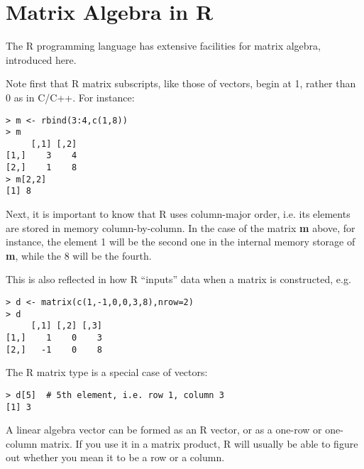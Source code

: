 \section{Matrix Algebra in R}

The R programming language has extensive facilities for matrix algebra,
introduced here.  

Note first that R matrix subscripts, like those of vectors, begin at 1,
rather than 0 as in C/C++.  For instance:

\begin{lstlisting}
> m <- rbind(3:4,c(1,8))
> m
     [,1] [,2]
[1,]    3    4
[2,]    1    8
> m[2,2]
[1] 8
\end{lstlisting}

Next, it is important to know that R uses column-major order, i.e.  its
elements are stored in memory column-by-column.  In the case of the
matrix {\bf m} above, for instance, the element 1 will be the second one
in the internal memory storage of {\bf m}, while the 8 will be the
fourth.  

This is also reflected in how R ``inputs'' data when a matrix is
constructed, e.g.

\begin{lstlisting}
> d <- matrix(c(1,-1,0,0,3,8),nrow=2)
> d
     [,1] [,2] [,3]
[1,]    1    0    3
[2,]   -1    0    8
\end{lstlisting}

The R matrix type is a special case of vectors:

\begin{lstlisting}
> d[5]  # 5th element, i.e. row 1, column 3
[1] 3
\end{lstlisting}

A linear algebra vector can be formed as an R vector, or as a one-row or
one-column matrix.  If you use it in a matrix product, R will usually be
able to figure out whether you mean it to be a row or a column.

